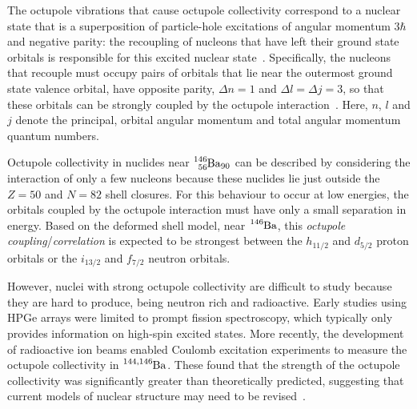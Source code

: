 \documentclass[12pt,a4paper]{article}
\begin{document}
\medskip
\noindent
The octupole vibrations that cause octupole collectivity correspond to a nuclear state that is a superposition of particle-hole excitations of angular momentum $3\hbar$ and negative parity: the recoupling of nucleons that have left their ground state orbitals is responsible for this excited nuclear state~\cite{rohozinski_octupole_1988}.
Specifically, the nucleons that recouple must occupy pairs of orbitals that lie near the outermost ground state valence orbital, have opposite parity, $\Delta n = 1$ and $\Delta l = \Delta j = 3$, so that these orbitals can be strongly coupled by the octupole interaction~\cite{butler_intrinsic_1996}.
Here, $n$, $l$ and $j$ denote the principal, orbital angular momentum and total angular momentum quantum numbers.

\medskip
\noindent
Octupole collectivity in nuclides near $\ce{^{146}_{56}Ba_{90}}$ can be described by considering the interaction of only a few nucleons because these nuclides lie just outside the $Z = 50$ and $N = 82$ shell closures.
For this behaviour to occur at low energies, the orbitals coupled by the octupole interaction must have only a small separation in energy.
Based on the deformed shell model, near $\ce{^{146}Ba}$, this \textit{octupole coupling}/\textit{correlation} is expected to be strongest between the $h_{11/2}$ and $d_{5/2}$ proton orbitals or the $i_{13/2}$ and $f_{7/2}$ neutron orbitals.

\medskip
\noindent
However, nuclei with strong octupole collectivity are difficult to study because they are hard to produce, being neutron rich and radioactive.
Early studies using HPGe arrays were limited to prompt fission spectroscopy, %
which typically only provides information on high-spin excited states.
More recently, the development of radioactive ion beams enabled Coulomb excitation experiments
to measure the octupole collectivity in $\ce{^{144,146}Ba}$.
These found that the strength of the octupole collectivity was significantly greater than theoretically predicted, suggesting that current models of nuclear structure may need to be revised~\cite{bucher_direct_2016,bucher_direct_2017}.
\end{document}
